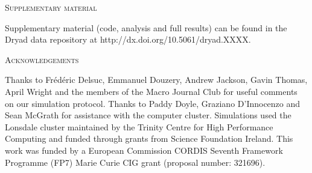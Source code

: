 \documentclass[12pt,letterpaper]{article}
\renewcommand{\section}[1]{%
\bigskip
\begin{center}
\begin{Large}
\normalfont\scshape #1
\medskip
\end{Large}
\end{center}}
\begin{document}
\section{Supplementary material}
Supplementary material (code, analysis and full results) can be found in the Dryad data repository at http://dx.doi.org/10.5061/dryad.XXXX. %

\section{Acknowledgements}
Thanks to Fr\'{e}d\'{e}ric Delsuc, Emmanuel Douzery, Andrew Jackson, Gavin Thomas, April Wright and the members of the Macro Journal Club %
for useful comments on our simulation protocol.
Thanks to Paddy Doyle, Graziano D'Innocenzo and Sean McGrath for assistance with the computer cluster. Simulations used the Lonsdale cluster maintained by the Trinity Centre for High Performance Computing and funded through grants from Science Foundation Ireland. This work was funded by a European Commission CORDIS Seventh Framework Programme (FP7) Marie Curie CIG grant (proposal number: 321696).






%    

\end{document}
